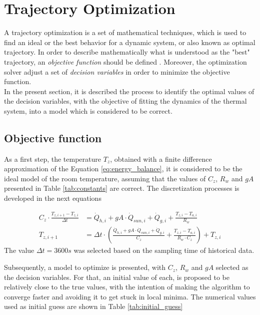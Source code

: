 \section{Trajectory Optimization}
\label{sec:trajectory_optimization}

A trajectory optimization is a set of mathematical techniques, which is used to find an ideal or the best behavior for a dynamic system, or also known as optimal trajectory. In order to describe mathematically what is understood as the "best" trajectory, an \emph{objective function} should be defined \cite{kelly2017introduction}. Moreover, the optimization solver adjust a set of \emph{decision variables} in order to minimize the objective function.\\
In the present section, it is described the process to identify the optimal values of the decision variables, with the objective of fitting the dynamics of the thermal system, into a model which is considered to be correct. 

\subsection{Objective function}
As a first step, the temperature $T_z$, obtained with a finite difference approximation of the Equation \ref{eq:energy_balance}, it is considered to be the ideal model of the room temperature, assuming that the values of $C_z$, $R_w$ and $gA$ presented in Table \ref{tab:constants} are correct. The discretization processes is developed in the next equations

\begin{align}
C_z \cdot \frac{T_{z,i+1}-T_{z,i}}{\Delta t} &= \dot{Q}_{h,i} + gA \cdot \dot{Q}_{sun, i} + \dot{Q}_{g,i}  + \frac{T_{z,i}-T_{a,i}}{R_w}\\
T_{z,i+1} &= \Delta t \cdot \left( \frac{\dot{Q}_{h,i} + gA \cdot \dot{Q}_{sun, i} + \dot{Q}_{g,i}}{C_z} + \frac{T_{z,i}-T_{a,i}}{R_w \cdot C_z} \right) + T_{z,i}
\label{eq:finite_difference}
\end{align}
The value $\Delta t = 3600s$ was selected based on the sampling time of historical data.

Subsequently, a model to optimize is presented, with $C_z$, $R_w$ and $gA$ selected as the decision variables. For that, an initial value of each, is proposed to be relatively close to the true values, with the intention of making the algorithm to converge faster and avoiding it to get stuck in local minima. The numerical values used as initial guess are shown in Table \ref{tab:initial_guess}


